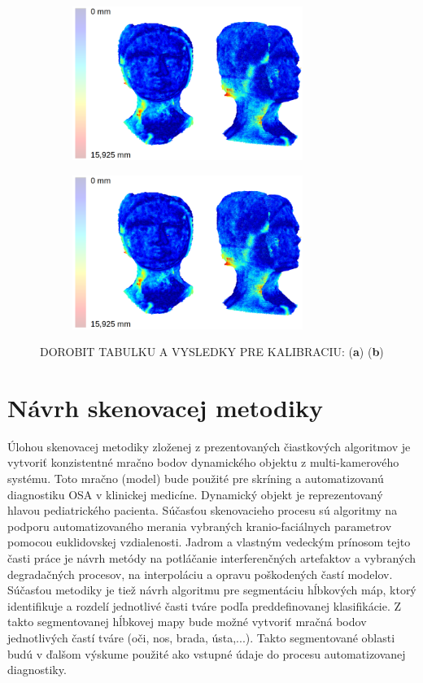 \begin{figure}[h]
	\centering
	\begin{subfigure}[b]{0.48\textwidth}
		\centering
		\includegraphics[height=5cm]{figures/calibration_hausdorff_multi.png}
		\caption{}
		\label{fig:calib:multi:haus:uncalib}
	\end{subfigure}
	\hfill
	\begin{subfigure}[b]{0.48\textwidth}
		\centering
		\includegraphics[height=5cm]{figures/calibration_hausdorff_multi.png}
		\caption{}
		\label{fig:calib:multi:haus:calib}
	\end{subfigure}
	\caption{DOROBIT TABULKU A VYSLEDKY PRE KALIBRACIU: (\textbf{a})  (\textbf{b})}
	\label{fig:calib:multi:haus}
\end{figure}

\section{Návrh skenovacej metodiky}

Úlohou skenovacej metodiky zloženej z prezentovaných čiastkových algoritmov je vytvoriť konzistentné mračno bodov dynamického objektu z multi-kamerového systému. Toto mračno (model) bude použité pre skríning a automatizovanú diagnostiku OSA v klinickej medicíne. Dynamický objekt je reprezentovaný hlavou pediatrického pacienta. Súčasťou skenovacieho procesu sú algoritmy na podporu automatizovaného merania vybraných kranio-faciálnych parametrov pomocou euklidovskej vzdialenosti. Jadrom a vlastným vedeckým prínosom tejto časti práce je návrh metódy na potláčanie interferenčných artefaktov a vybraných degradačných procesov, na interpoláciu a opravu poškodených častí modelov. Súčasťou metodiky je tiež návrh algoritmu pre segmentáciu hĺbkových máp, ktorý identifikuje a rozdelí jednotlivé časti tváre podľa preddefinovanej klasifikácie.
Z takto segmentovanej hĺbkovej mapy bude možné vytvoriť mračná bodov jednotlivých častí tváre (oči, nos, brada, ústa,...). Takto segmentované oblasti budú v ďalšom výskume použité ako vstupné údaje do procesu automatizovanej diagnostiky. \newline

